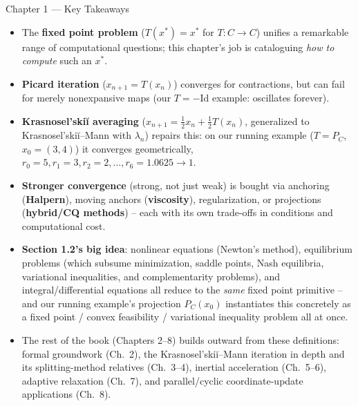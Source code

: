 \documentclass[aspectratio=169,10pt]{beamer}
\newcommand{\Id}{\mathrm{Id}}
\begin{document}
\begin{frame}{Chapter 1 --- Key Takeaways}
\small
\begin{itemize}
  \item The \textbf{fixed point problem} ($T(x^*)=x^*$ for $T:C\to C$)
    unifies a remarkable range of computational questions; this chapter's
    job is cataloguing \emph{how to compute} such an $x^*$.
  \item \textbf{Picard iteration} ($x_{n+1}=T(x_n)$) converges for
    contractions, but can fail for merely nonexpansive maps (our
    $T=-\Id$ example: oscillates forever).
  \item \textbf{Krasnosel'ski\u{i} averaging}
    ($x_{n+1}=\tfrac12 x_n+\tfrac12 T(x_n)$, generalized to
    Krasnosel'ski\u{i}--Mann with $\lambda_n$) repairs this: on our
    running example ($T=P_C$, $x_0=(3,4)$) it converges geometrically,
    $r_0{=}5,r_1{=}3,r_2{=}2,\dots,r_6{=}1.0625\to1$.
  \item \textbf{Stronger convergence} (strong, not just weak) is bought
    via anchoring (\textbf{Halpern}), moving anchors (\textbf{viscosity}),
    regularization, or projections (\textbf{hybrid/CQ methods}) -- each
    with its own trade-offs in conditions and computational cost.
  \item \textbf{Section 1.2's big idea}: nonlinear equations (Newton's
    method), equilibrium problems (which subsume minimization, saddle
    points, Nash equilibria, variational inequalities, and
    complementarity problems), and integral/differential equations all
    reduce to the \emph{same} fixed point primitive -- and our running
    example's projection $P_C(x_0)$ instantiates this concretely as a
    fixed point / convex feasibility / variational inequality problem all
    at once.
  \item The rest of the book (Chapters 2--8) builds outward from these
    definitions: formal groundwork (Ch.\ 2), the Krasnosel'ski\u{i}--Mann
    iteration in depth and its splitting-method relatives (Ch.\ 3--4),
    inertial acceleration (Ch.\ 5--6), adaptive relaxation (Ch.\ 7), and
    parallel/cyclic coordinate-update applications (Ch.\ 8).
\end{itemize}

\end{frame}
\end{document}
